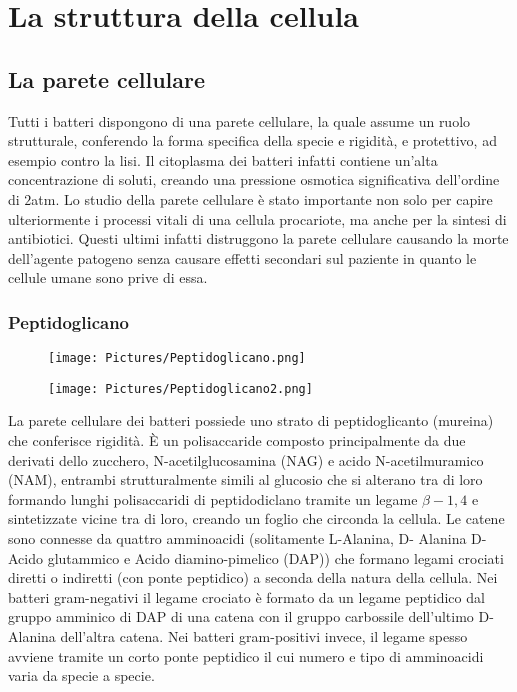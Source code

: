 \chapter{La struttura della cellula}
\section{La parete cellulare}
Tutti i batteri dispongono di una parete cellulare, la quale assume un ruolo strutturale, conferendo la forma specifica della specie e rigidità, e 
protettivo, ad esempio contro la lisi. Il citoplasma dei batteri infatti contiene un’alta concentrazione di soluti, creando una pressione osmotica 
significativa dell’ordine di $2$\si{atm}. Lo studio della parete cellulare è stato importante non solo per capire 
ulteriormente i processi vitali di una cellula procariote, ma anche per la sintesi di antibiotici. Questi ultimi infatti distruggono la parete cellulare causando la morte dell'agente patogeno senza causare effetti secondari sul paziente
in quanto le cellule umane sono prive di essa.
\subsection{Peptidoglicano}
\begin{multicols}{2}
\begin{figure}[H]
	\texttt{[image: Pictures/Peptidoglicano.png]}
\end{figure}    
\columnbreak
\begin{figure}[H]
	\texttt{[image: Pictures/Peptidoglicano2.png]}
\end{figure}       
\end{multicols}
La parete cellulare dei batteri possiede uno strato di peptidoglicanto (mureina) che conferisce rigidit\`a. \`E
un polisaccaride composto principalmente da due derivati dello zucchero, N-acetilglucosamina (NAG) e acido N-acetilmuramico (NAM), entrambi strutturalmente 
simili al glucosio che si alterano tra di loro formando lunghi polisaccaridi di peptidodiclano tramite un legame $\beta-1,4$ e sintetizzate vicine tra di loro, creando un 
foglio che circonda la cellula. Le catene sono connesse da quattro amminoacidi (solitamente L-Alanina, D- Alanina D-Acido glutammico e Acido diamino-pimelico (DAP)) che formano legami crociati 
diretti o indiretti (con ponte peptidico) a seconda della natura della cellula. Nei batteri gram-negativi il legame crociato è formato da un legame peptidico dal gruppo amminico di DAP di una 
catena con il gruppo carbossile dell’ultimo D-Alanina dell’altra catena. Nei batteri gram-positivi invece, il legame spesso avviene tramite un corto ponte 
peptidico il cui numero e tipo di amminoacidi varia da specie a specie. 
